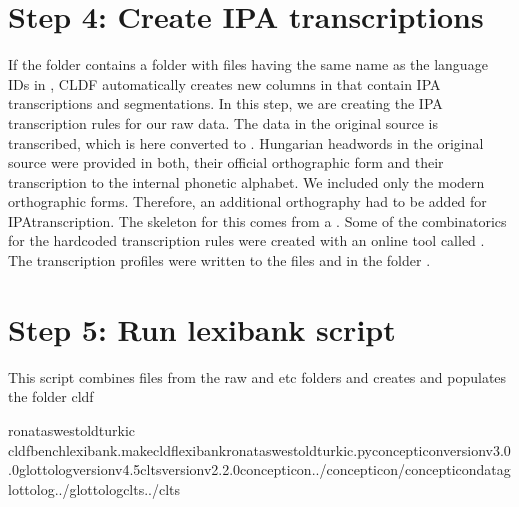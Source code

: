 \documentclass[letterpaper,10pt,english]{sphinxmanual}
\begin{document}
{{{{\section{Step 4: Create IPA transcriptions}
\label{\detokenize{mkcldf:step-4-create-ipa-transcriptions}}
\sphinxAtStartPar
If the folder  contains a folder  with files having the
same
name as the language IDs in , CLDF automatically creates
new columns in  that contain
IPA transcriptions and segmentations. In this step, we are creating the
IPA transcription rules for our raw data. The data in the original source
is 
\sphinxhyphen{}transcribed, which is here converted to .
Hungarian
headwords in the original source were provided in both, their official
orthographic form and their transcription to the internal
phonetic alphabet. We included only the modern orthographic forms.
Therefore, an additional orthography had to be added for IPA\sphinxhyphen{}transcription.
The skeleton for this comes from a .
Some of the combinatorics for the hard\sphinxhyphen{}coded transcription rules were created
with an online tool called . The transcription profiles were
written to the files     and
 in the folder .


\section{Step 5: Run lexibank script}
\label{\detokenize{mkcldf:step-5-run-lexibank-script}}
\sphinxAtStartPar
This script combines files from the raw and etc folders and creates and
populates the folder cldf

\begin{sphinxVerbatim}[commandchars=\\\{\}]
ronataswestoldturkic
cldfbenchlexibank.makecldflexibank\PYGZus{}ronataswestoldturkic.py\PYGZhy{}\PYGZhy{}concepticon\PYGZhy{}versionv3.0.0\PYGZhy{}\PYGZhy{}glottolog\PYGZhy{}versionv4.5\PYGZhy{}\PYGZhy{}clts\PYGZhy{}versionv2.2.0\PYGZhy{}\PYGZhy{}concepticon../concepticon/concepticon\PYGZhy{}data\PYGZhy{}\PYGZhy{}glottolog../glottolog\PYGZhy{}\PYGZhy{}clts../clts
\end{sphinxVerbatim}

}}}}
\end{document}
